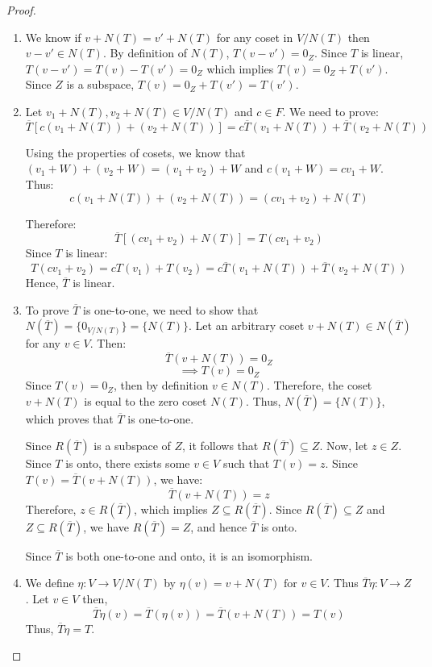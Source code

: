 \documentclass[12pt, a4paper]{article}
\theoremstyle{definition}
\theoremstyle{remark}
\begin{document}
\begin{proof}
    \begin{enumerate}
        \item We know if $v+N(T) = v'+N(T)$ for any coset in $V/N(T)$ then $v - v' \in N(T)$. By definition of $N(T)$, $T(v-v') = 0_Z$. Since $T$ is linear, $T(v-v') = T(v) - T(v') = 0_Z$ which implies $T(v) = 0_Z + T(v')$. Since $Z$ is a subspace, $T(v) = 0_Z + T(v') = T(v')$.

        \item Let $v_1 + N(T), v_2 + N(T) \in V/N(T)$ and $c \in F$. We need to prove:
        \[ \overline{T}[c(v_1 + N(T)) + (v_2 + N(T))] = c\overline{T}(v_1 + N(T)) + \overline{T}(v_2 + N(T)) \]

        Using the properties of cosets, we know that $(v_1 + W) + (v_2 + W) = (v_1 + v_2) + W$ and $c(v_1 + W) = cv_1 + W$. Thus:
        \[ c(v_1 + N(T)) + (v_2 + N(T)) = (cv_1 + v_2) + N(T) \]

        Therefore:
        \[ \overline{T}[(cv_1 + v_2) + N(T)] = T(cv_1 + v_2) \]
        Since $T$ is linear:
        \[ T(cv_1 + v_2) = cT(v_1) + T(v_2) = c\overline{T}(v_1 + N(T)) + \overline{T}(v_2 + N(T)) \]
        Hence, $\overline{T}$ is linear.
        \item To prove $\overline{T}$ is one-to-one, we need to show that $N(\overline{T}) = \{0_{V/N(T)}\} = \{N(T)\}$. Let an arbitrary coset $v + N(T) \in N(\overline{T})$ for any $v \in V$. Then:
        \[ \overline{T}(v + N(T)) = 0_Z \]
        \[ \implies T(v) = 0_Z \]
        Since $T(v) = 0_Z$, then by definition $v \in N(T)$. Therefore, the coset $v + N(T)$ is equal to the zero coset $N(T)$. Thus, $N(\overline{T}) = \{N(T)\}$, which proves that $\overline{T}$ is one-to-one.

        Since $R(\overline{T})$ is a subspace of $Z$, it follows that $R(\overline{T}) \subseteq Z$. Now, let $z \in Z$. Since $T$ is onto, there exists some $v \in V$ such that $T(v) = z$. Since $T(v) = \overline{T}(v + N(T))$, we have:
        \[ \overline{T}(v + N(T)) = z \]
        Therefore, $z \in R(\overline{T})$, which implies $Z \subseteq R(\overline{T})$. Since $R(\overline{T}) \subseteq Z$ and $Z \subseteq R(\overline{T})$, we have $R(\overline{T}) = Z$, and hence $\overline{T}$ is onto.

        Since $\overline{T}$ is both one-to-one and onto, it is an isomorphism.

        \item We define $\eta:V \to V/N(T)$ by $\eta(v) = v + N(T) \text{ for } v \in V$. Thus $\overline{T}\eta:V \to Z$. Let $v \in V$ then,
        \[\overline{T}\eta(v) = \overline{T}(\eta(v)) = \overline{T}(v + N(T)) = T(v)\]
        Thus, $\overline{T}\eta = T$.
    \end{enumerate}
\end{proof}
\end{document}
